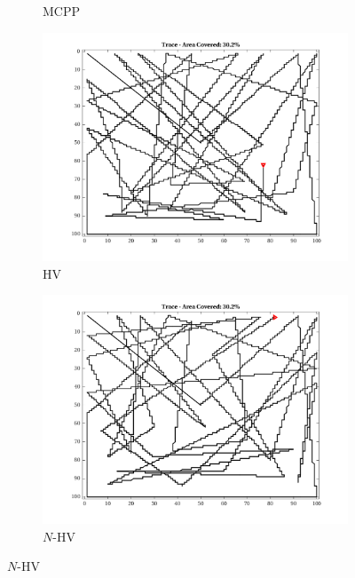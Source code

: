 \begin{figure}[htb!]
\begin{subfigure}[t]{0.25\textwidth}
        \captionsetup{skip=0.20\baselineskip,size=footnotesize}
        \caption{MCPP}
    \end{subfigure}%
    \begin{subfigure}[t]{0.25\textwidth}
        \centering
        \includegraphics[width=\linewidth]{figures/path_nhv_30p_100x100_sf_25_seed_1.png}
        \captionsetup{skip=0.20\baselineskip,size=footnotesize}
        \caption{HV}
    \end{subfigure}%
    \begin{subfigure}[t]{0.25\textwidth}
        \centering
        \includegraphics[width=\linewidth]{figures/path_nnhv_30p_100x100_sf_25_seed_1.png}
        \captionsetup{skip=0.20\baselineskip,size=footnotesize}
        \caption{$N$-HV}

\end{subfigure}
\end{figure}
